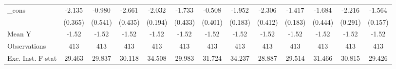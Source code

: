 {\begin{tabular}{l*{12}{c}}
\addlinespace
\_cons      &      -2.135\sym{***}&      -0.980\sym{*}  &      -2.661\sym{***}&      -2.032\sym{***}&      -1.733\sym{***}&      -0.508         &      -1.952\sym{***}&      -2.306\sym{***}&      -1.417\sym{***}&      -1.684\sym{***}&      -2.216\sym{***}&      -1.564\sym{***}\\
            &     (0.365)         &     (0.541)         &     (0.435)         &     (0.194)         &     (0.433)         &     (0.401)         &     (0.183)         &     (0.412)         &     (0.183)         &     (0.444)         &     (0.291)         &     (0.157)         \\
\midrule
Mean Y      &       -1.52         &       -1.52         &       -1.52         &       -1.52         &       -1.52         &       -1.52         &       -1.52         &       -1.52         &       -1.52         &       -1.52         &       -1.52         &       -1.52         \\
Observations&         413         &         413         &         413         &         413         &         413         &         413         &         413         &         413         &         413         &         413         &         413         &         413         \\
Exc. Inst. F-stat&      29.463         &      29.837         &      30.118         &      34.508         &      29.983         &      31.724         &      34.237         &      28.887         &      29.514         &      31.466         &      30.815         &      29.426         \\
\bottomrule
\end{tabular}
}
